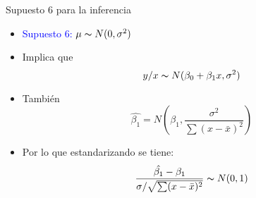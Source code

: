 \begin{frame}{Supuesto 6 para la inferencia}
	\begin{itemize}
		\item \textcolor{blue}{Supuesto 6: $\mu \thicksim N(0,\sigma^2)$}
		\item Implica que 
		$$y/x \thicksim N(\beta_{0}+\beta_{1}x,\sigma^2)$$
		\item También 
		$$\hat{\beta_{1}}=N\left(\beta_{1},\frac{\sigma^2}{\sum (x-\bar x)^2}\right)$$ 
		\item Por lo que estandarizando se tiene:
		$$\frac{\hat{\beta_{1}}-\beta_{1}}{\sigma/\sqrt{\sum (x-\bar x)^2}} \thicksim N(0,1)$$
	\end{itemize}
\end{frame}
